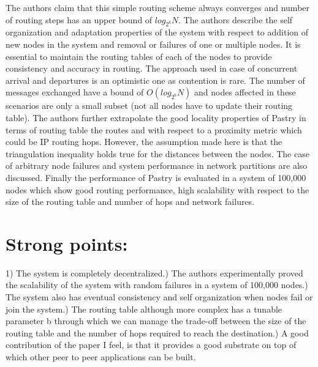 \documentclass[12pt]{article}
\begin{document}
\newline
The authors claim that this simple routing scheme always converges and number of routing steps has an upper bound of $log_{2^b}N$.
\newline \newline
The authors describe the self organization and adaptation properties of the system with respect to addition of new nodes in the system and removal or failures of one or multiple nodes. It is essential to maintain the routing tables of each of the nodes to provide consistency and accuracy in routing. The approach used in case of concurrent arrival and departures is an optimistic one as contention is rare. The number of messages exchanged have a bound of $O(log_{2^b} N)$ and nodes affected in these scenarios are only a small subset (not all nodes have to update their routing table).
\newline \newline
The authors further extrapolate the good locality properties of Pastry in terms of routing table the routes and with respect to a proximity metric which could be IP routing hops. However, the assumption made here is that the triangulation inequality holds true for the distances between the nodes.
\newline
The case of arbitrary node failures and system performance in network partitions are also discussed.
\newline \newline
Finally the performance of Pastry is evaluated in a system of 100,000 nodes which show good routing performance, high scalability with respect to the size of the routing table and number of hops and network failures.

\section{Strong points:}
1) The system is completely decentralized.) The authors experimentally proved the scalability of the system with random failures in a system of 100,000 nodes.) The system also has eventual consistency and self organization when nodes fail or join the system.) The routing table although more complex has a tunable parameter b through which we can manage the trade-off between the size of the routing table and the number of hops required to reach the destination.) A good contribution of the paper I feel, is that it provides a good substrate on top of which other peer to peer applications can be built.
\end{document}
